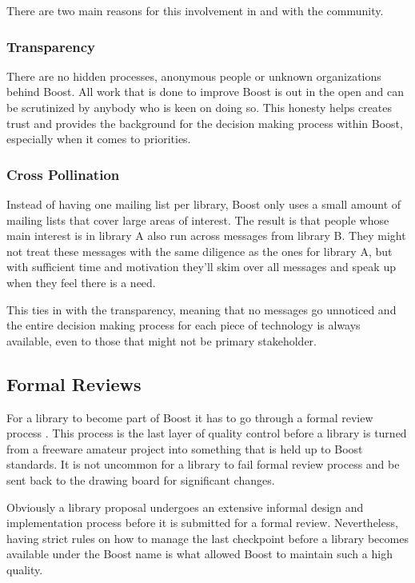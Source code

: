 \documentclass[twocolumn]{paper}
\begin{document}
There are two main reasons for this involvement in and with the
community.

\subsubsection{Transparency}
There are no hidden processes, anonymous people or unknown
organizations behind Boost. All work that is done to improve Boost
is out in the open and can be scrutinized by anybody who is keen on
doing so. This honesty helps creates trust and provides the
background for the decision making process within Boost, especially
when it comes to priorities.

\subsubsection{Cross Pollination}

Instead of having one mailing list per library, Boost only uses a
small amount of mailing lists that cover large areas of interest.
The result is that people whose main interest is in library A also
run across messages from library B. They might not treat these
messages with the same diligence as the ones for library A, but with
sufficient time and motivation they'll skim over all messages and
speak up when they feel there is a need.

This ties in with the transparency, meaning that no messages go
unnoticed and the entire decision making process for each piece of
technology is always available, even to those that might not be
primary stakeholder.

\subsection{Formal Reviews}

For a library to become part of Boost it has to go through a formal
review process \cite{bib:formal review}. This process is the last
layer of quality control before a library is turned from a freeware
amateur project into something that is held up to Boost standards.
It is not uncommon for a library to fail formal review process and
be sent back to the drawing board for significant changes.

Obviously a library proposal undergoes an extensive informal design
and implementation process before it is submitted for a formal
review. Nevertheless, having strict rules on how to manage the last
checkpoint before a library becomes available under the Boost name
is what allowed Boost to maintain such a high quality.
\end{document}
